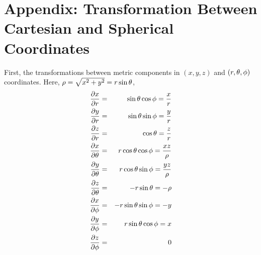 \section{Appendix: Transformation Between Cartesian and Spherical Coordinates}

First, the transformations between metric components in $(x,y,z)$ and $(r,\theta,\phi)$ coordinates. Here, $\rho=\sqrt{x^2+y^2}=r\sin\theta$,
\begin{eqnarray*}
  \frac{\partial x}{\partial r}
  &=&
  \sin\theta\cos\phi 
  =
  \frac{x}{r}
\\
  \frac{\partial y}{\partial r}
  &=&
  \sin\theta\sin\phi 
  =
  \frac{y}{r}
\\
  \frac{\partial z}{\partial r}
  &=&
  \cos\theta 
  =
  \frac{z}{r}
\\
  \frac{\partial x}{\partial \theta}
  &=&
  r\cos\theta\cos\phi 
  =
  \frac{xz}{\rho}
\\
  \frac{\partial y}{\partial \theta}
  &=&
  r\cos\theta\sin\phi 
  =
  \frac{yz}{\rho}
\\
  \frac{\partial z}{\partial \theta}
  &=&
  -r\sin\theta 
  =
  -\rho
\\
  \frac{\partial x}{\partial \phi}
  &=&
  -r\sin\theta\sin\phi
  =
  -y
\\
  \frac{\partial y}{\partial \phi}
  &=&
  r\sin\theta\cos\phi 
  =
  x
\\
  \frac{\partial z}{\partial \phi}
  &=&
  0
\end{eqnarray*}


